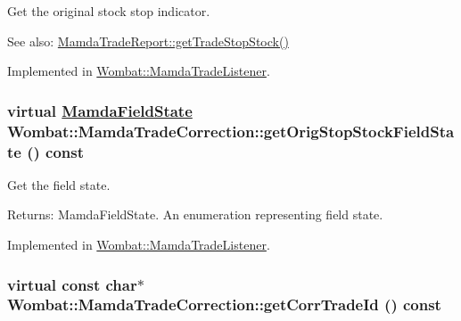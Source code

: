 Get the original stock stop indicator. 

\begin{Desc}
\item[See also:]\hyperlink{classWombat_1_1MamdaTradeReport_5e97df5f0d331db50a07db5ebf9336da}{Mamda\-Trade\-Report::get\-Trade\-Stop\-Stock()} \end{Desc}


Implemented in \hyperlink{classWombat_1_1MamdaTradeListener_4a5498e32feec686f6989e3ced92a984}{Wombat::Mamda\-Trade\-Listener}.\hypertarget{classWombat_1_1MamdaTradeCorrection_7e60034450dfcaf39654b325bc487940}{
\subsubsection[getOrigStopStockFieldState]{\setlength{\rightskip}{0pt plus 5cm}virtual \hyperlink{namespaceWombat_93aac974f2ab713554fd12a1fa3b7d2a}{Mamda\-Field\-State} Wombat::Mamda\-Trade\-Correction::get\-Orig\-Stop\-Stock\-Field\-State () const}}
\label{classWombat_1_1MamdaTradeCorrection_7e60034450dfcaf39654b325bc487940}


Get the field state. 

\begin{Desc}
\item[Returns:]Mamda\-Field\-State. An enumeration representing field state. \end{Desc}


Implemented in \hyperlink{classWombat_1_1MamdaTradeListener_f877c87cdd8ba3db4e1c41f8465ed249}{Wombat::Mamda\-Trade\-Listener}.\hypertarget{classWombat_1_1MamdaTradeCorrection_9e1763eab254bbe87ff3a577bb7c5ab3}{
\subsubsection[getCorrTradeId]{\setlength{\rightskip}{0pt plus 5cm}virtual const char$\ast$ Wombat::Mamda\-Trade\-Correction::get\-Corr\-Trade\-Id () const}}
\label{classWombat_1_1MamdaTradeCorrection_9e1763eab254bbe87ff3a577bb7c5ab3}


